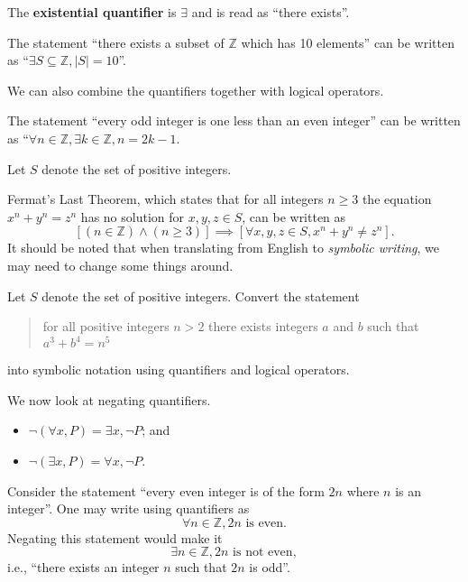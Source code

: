\begin{definition}
    The \textbf{existential quantifier} is $\exists$ and is  read as ``there exists''.
\end{definition}
\begin{example}
    The statement ``there exists a subset of $\mathbb{Z}$ which has 10 elements'' can be written as ``$\exists S \subseteq \mathbb{Z}, |S| = 10$''.
\end{example}

We can also combine the quantifiers together with logical operators.
\begin{example}
    The statement ``every odd integer is one less than an even integer'' can be written as ``$\forall n \in \mathbb{Z}, \exists k \in \mathbb{Z}, n = 2k - 1$.
\end{example}
\begin{example}
    Let $S$ denote the set of positive integers.
    
    Fermat's Last Theorem, which states that for all integers $n\geq 3$ the equation $x^n + y^n = z^n$ has no solution for $x, y, z \in S$, can be written as
    \[
        \left[(n \in \mathbb{Z}) \land (n \geq 3)\right] \implies \left[\forall x, y, z \in S, x^n + y^n \neq z^n\right].
    \]
    It should be noted that when translating from English to \textit{symbolic writing}, we may need to change some things around.
\end{example}

\begin{exercise}
    Let $S$ denote the set of positive integers. Convert the statement
    \begin{quote}
        for all positive integers $n > 2$ there exists integers $a$ and $b$ such that $a^3 + b^4 = n^5$
    \end{quote}
    into symbolic notation using quantifiers and logical operators.
\end{exercise}

We now look at negating quantifiers.
\begin{itemize}
    \item $\lnot(\forall x, P) = \exists x, \lnot P$; and
    \item $\lnot(\exists x, P) = \forall x, \lnot P$.
\end{itemize}
\begin{example}
    Consider the statement ``every even integer is of the form $2n$ where $n$ is an integer''. One may write using quantifiers as
    \[
        \forall n \in\mathbb{Z}, 2n \text{ is even}.
    \]
    Negating this statement would make it
    \[
        \exists n \in \mathbb{Z}, 2n \text{ is not even},
    \]
    i.e., ``there exists an integer $n$ such that $2n$ is odd''.
\end{example}

